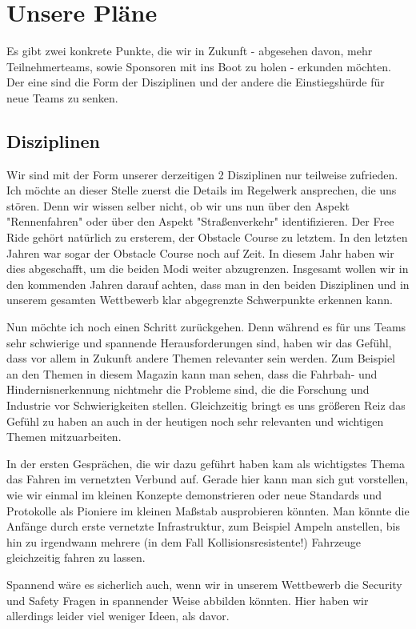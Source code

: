 \section{Unsere Pläne}
Es gibt zwei konkrete Punkte, die wir in Zukunft - abgesehen 
davon, mehr Teilnehmerteams, sowie Sponsoren mit ins Boot zu holen -
erkunden möchten. 
Der eine sind die Form der Disziplinen und der andere die Einstiegshürde
für neue Teams zu senken.

\subsection{Disziplinen}
Wir sind mit der Form unserer derzeitigen 2 Disziplinen nur teilweise zufrieden.
Ich möchte an dieser Stelle zuerst die Details im Regelwerk
ansprechen, die uns stören.
Denn wir wissen selber nicht, ob wir uns nun über den Aspekt "Rennenfahren"
oder über den Aspekt "Straßenverkehr" identifizieren. 
Der Free Ride gehört natürlich zu ersterem, der Obstacle Course zu letztem.
In den letzten Jahren war sogar der Obstacle Course noch auf Zeit.
In diesem Jahr haben wir dies abgeschafft, um die beiden Modi weiter abzugrenzen.
Insgesamt wollen wir in den kommenden Jahren darauf achten, dass man in den
beiden Disziplinen und in unserem gesamten Wettbewerb klar abgegrenzte Schwerpunkte 
erkennen kann.

Nun möchte ich noch einen Schritt zurückgehen. 
Denn während es für uns Teams sehr schwierige und spannende Herausforderungen sind, 
haben wir das Gefühl, dass vor allem in Zukunft andere
Themen relevanter sein werden. 
Zum Beispiel an den Themen in diesem Magazin kann man sehen, dass die Fahrbah- und
Hindernisnerkennung nichtmehr die Probleme sind, die die Forschung und Industrie
vor Schwierigkeiten stellen. 
Gleichzeitig bringt es uns größeren Reiz das Gefühl zu haben an auch in der heutigen 
noch sehr relevanten und wichtigen Themen mitzuarbeiten. 

In der ersten Gesprächen, die wir dazu geführt haben kam als wichtigstes Thema 
das Fahren im vernetzten Verbund auf. Gerade hier kann man sich gut vorstellen,
wie wir einmal im kleinen Konzepte demonstrieren oder neue Standards und Protokolle
als Pioniere im kleinen Maßstab ausprobieren könnten. Man könnte die Anfänge 
durch erste vernetzte Infrastruktur, zum Beispiel Ampeln anstellen, bis hin zu
irgendwann mehrere (in dem Fall Kollisionsresistente!) Fahrzeuge gleichzeitig 
fahren zu lassen.

Spannend wäre es sicherlich auch, wenn wir in unserem Wettbewerb die
Security und Safety Fragen in spannender Weise abbilden könnten. Hier
haben wir allerdings leider viel weniger Ideen, als davor.

